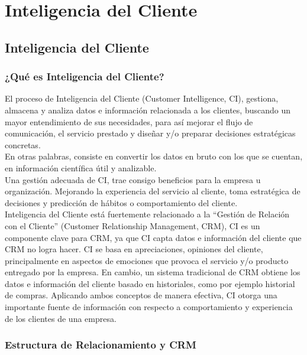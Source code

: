 \chapter[Inteligencia del Cliente]{Inteligencia del Cliente}
\label{ch:ic}

\section{Inteligencia del Cliente}
\subsection{¿Qué es Inteligencia del Cliente?}

El proceso de Inteligencia del Cliente (Customer Intelligence, CI), gestiona, almacena y analiza datos e información relacionada a los clientes, buscando un mayor entendimiento de sus necesidades, para así mejorar el flujo de comunicación, el servicio prestado y diseñar y/o preparar decisiones estratégicas concretas.\cite{ic}\\

En otras palabras, consiste en convertir los datos en bruto con los que se cuentan, en información científica útil y analizable. \cite{ic}\\

Una gestión adecuada de CI, trae consigo beneficios para la empresa u organización. Mejorando la experiencia del servicio al cliente, toma estratégica de decisiones y predicción de hábitos o comportamiento del cliente.\cite{ic}\\

Inteligencia del Cliente está fuertemente relacionado a la ``Gestión de Relación con el Cliente'' (Customer Relationship Management, CRM), CI es un componente clave para CRM, ya que CI capta datos e información del cliente que CRM no logra hacer. CI se basa en apreciaciones, opiniones del cliente, principalmente en aspectos de emociones que provoca el servicio y/o producto entregado por la empresa. En cambio, un sistema tradicional de CRM obtiene los datos e información del cliente basado en historiales, como por ejemplo historial de compras. Aplicando ambos conceptos de manera efectiva, CI otorga una importante fuente de información con respecto a comportamiento y experiencia de los clientes de una empresa.\cite{wikiic}\\



\subsection{Estructura de Relacionamiento y CRM}

